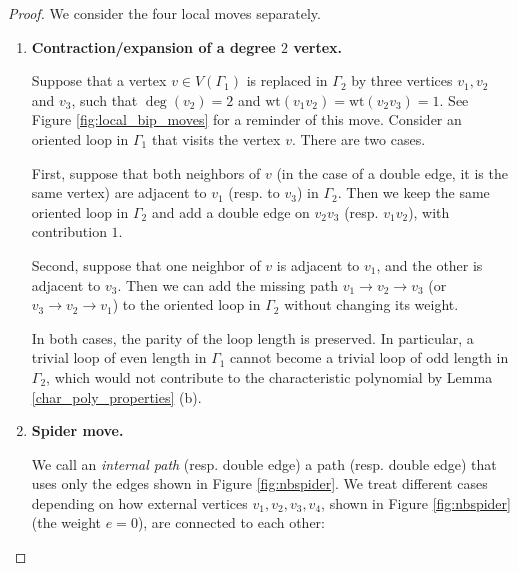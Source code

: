 \documentclass[12pt,a4paper]{article}
\theoremstyle{definition}
\def\wt{\mathrm {wt}}
\begin{document}
\begin{proof}
    We consider the four local moves separately.

    \begin{enumerate}[label=\Roman*.]
    \item \textbf{Contraction/expansion of a degree $2$ vertex.}
    
    Suppose that a vertex $v \in V(\Gamma_1)$ is replaced in $\Gamma_2$ by three vertices $v_1, v_2$ and $v_3$, such that $\deg(v_2) = 2$ and $\wt(v_1v_2) = \wt(v_2v_3) = 1$. See Figure \ref{fig:local_bip_moves} for a reminder of this move. Consider an oriented loop in $\Gamma_1$ that visits the vertex $v$. There are two cases.
    
    First, suppose that both neighbors of $v$ (in the case of a double edge, it is the same vertex) are adjacent to $v_1$ (resp. to $v_3$) in $\Gamma_2$. Then we keep the same oriented loop in $\Gamma_2$ and add a double edge on $v_2v_3$ (resp. $v_1v_2$), with contribution $1$.
    
    Second, suppose that one neighbor of $v$ is adjacent to $v_1$, and the other is adjacent to $v_3$. Then we can add the missing path $v_1 \rightarrow v_2 \rightarrow v_3$ (or $v_3 \rightarrow v_2 \rightarrow v_1$) to the oriented loop in $\Gamma_2$ without changing its weight.

    In both cases, the parity of the loop length is preserved. In particular, a trivial loop of even length in $\Gamma_1$ cannot become a trivial loop of odd length in $\Gamma_2$, which would not contribute to the characteristic polynomial by Lemma \ref{char_poly_properties} (b).
    
    \item \textbf{Spider move.}

    We call an \emph{internal path} (resp. double edge) a path (resp. double edge) that uses only the edges shown in Figure \ref{fig:nbspider}. We treat different cases depending on how external vertices $v_1, v_2, v_3, v_4$, shown in Figure \ref{fig:nbspider} (the weight $e = 0$), are connected to each other:


\end{enumerate}
\end{proof}
\end{document}
